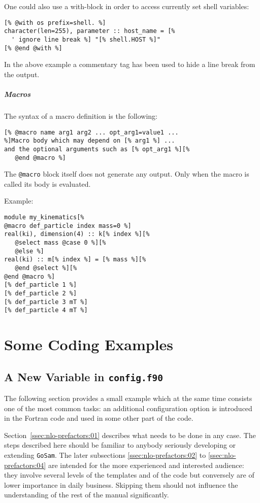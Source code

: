 \documentclass[11pt,a4paper]{refrep}
\newcommand{\golem}{{\tt GoSam}\xspace}
\begin{document}
One could also use a with-block in order to access currently set
shell variables:
\begin{lstlisting}
[% @with os prefix=shell. %]
character(len=255), parameter :: host_name = [%
  ' ignore line break %] "[% shell.HOST %]"
[% @end @with %]
\end{lstlisting}
In the above example a commentary tag has been used to hide a
line break from the output.

\paragraph{Macros}
The syntax of a macro definition is the following:
\begin{lstlisting}[language=gosamt]
[% @macro name arg1 arg2 ... opt_arg1=value1 ...
%]Macro body which may depend on [% arg1 %] ...
and the optional arguments such as [% opt_arg1 %][%
   @end @macro %]
\end{lstlisting}

\attention{} The \texttt{@macro} block itself does not generate
any output. Only when the macro is called its body is evaluated.

Example:
\begin{lstlisting}
module my_kinematics[%
@macro def_particle index mass=0 %]
real(ki), dimension(4) :: k[% index %][%
   @select mass @case 0 %][%
   @else %]
real(ki) :: m[% index %] = [% mass %][%
   @end @select %][%
@end @macro %]
[% def_particle 1 %]
[% def_particle 2 %]
[% def_particle 3 mT %]
[% def_particle 4 mT %]
\end{lstlisting}

\chapter{Some Coding Examples}

\section{A New Variable in \texttt{config.f90}}
The following section provides a small example which at the same time
consists one of the most common tasks: an additional configuration option
is introduced in the Fortran code and used in some other part of the code.

Section~\ref{ssec:nlo-prefactors:01} describes what needs to be done in
any case. The steps described here should be familiar to anybody seriously
developing or extending \golem{}. The later subsections 
\ref{ssec:nlo-prefactors:02} to \ref{ssec:nlo-prefactors:04} are intended
for the more experienced and interested audience: they involve several
levels of the templates and of the code but conversely are of lower
importance in daily business. Skipping them should not influence the
understanding of the rest of the manual significantly.
\end{document}
